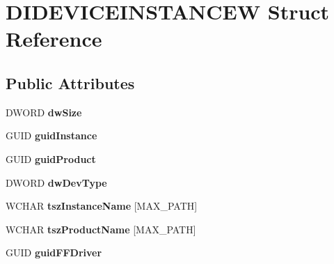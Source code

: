 \hypertarget{struct_d_i_d_e_v_i_c_e_i_n_s_t_a_n_c_e_w}{\section{D\-I\-D\-E\-V\-I\-C\-E\-I\-N\-S\-T\-A\-N\-C\-E\-W Struct Reference}
\label{struct_d_i_d_e_v_i_c_e_i_n_s_t_a_n_c_e_w}
}
\subsection*{Public Attributes}
\begin{DoxyCompactItemize}
\item 
\hypertarget{struct_d_i_d_e_v_i_c_e_i_n_s_t_a_n_c_e_w_a74ad8575e74fade39a58a23053ff9cc6}{D\-W\-O\-R\-D {\bfseries dw\-Size}}\label{struct_d_i_d_e_v_i_c_e_i_n_s_t_a_n_c_e_w_a74ad8575e74fade39a58a23053ff9cc6}

\item 
\hypertarget{struct_d_i_d_e_v_i_c_e_i_n_s_t_a_n_c_e_w_ae70f04afc0a1ec321c6e127a74fe2aea}{G\-U\-I\-D {\bfseries guid\-Instance}}\label{struct_d_i_d_e_v_i_c_e_i_n_s_t_a_n_c_e_w_ae70f04afc0a1ec321c6e127a74fe2aea}

\item 
\hypertarget{struct_d_i_d_e_v_i_c_e_i_n_s_t_a_n_c_e_w_abd493000bafbf8d6c63d4e3be60f510b}{G\-U\-I\-D {\bfseries guid\-Product}}\label{struct_d_i_d_e_v_i_c_e_i_n_s_t_a_n_c_e_w_abd493000bafbf8d6c63d4e3be60f510b}

\item 
\hypertarget{struct_d_i_d_e_v_i_c_e_i_n_s_t_a_n_c_e_w_a1c4b9fe0fb9fc915e7a213e6c2ffd597}{D\-W\-O\-R\-D {\bfseries dw\-Dev\-Type}}\label{struct_d_i_d_e_v_i_c_e_i_n_s_t_a_n_c_e_w_a1c4b9fe0fb9fc915e7a213e6c2ffd597}

\item 
\hypertarget{struct_d_i_d_e_v_i_c_e_i_n_s_t_a_n_c_e_w_ac513af8275475a6ceba700f896b72108}{W\-C\-H\-A\-R {\bfseries tsz\-Instance\-Name} \mbox{[}M\-A\-X\-\_\-\-P\-A\-T\-H\mbox{]}}\label{struct_d_i_d_e_v_i_c_e_i_n_s_t_a_n_c_e_w_ac513af8275475a6ceba700f896b72108}

\item 
\hypertarget{struct_d_i_d_e_v_i_c_e_i_n_s_t_a_n_c_e_w_a1e11fc845c9a7c5bc41a5fa6d7bed917}{W\-C\-H\-A\-R {\bfseries tsz\-Product\-Name} \mbox{[}M\-A\-X\-\_\-\-P\-A\-T\-H\mbox{]}}\label{struct_d_i_d_e_v_i_c_e_i_n_s_t_a_n_c_e_w_a1e11fc845c9a7c5bc41a5fa6d7bed917}

\item 
\hypertarget{struct_d_i_d_e_v_i_c_e_i_n_s_t_a_n_c_e_w_a549002e76313c10b693a332ea2f0becf}{G\-U\-I\-D {\bfseries guid\-F\-F\-Driver}}\label{struct_d_i_d_e_v_i_c_e_i_n_s_t_a_n_c_e_w_a549002e76313c10b693a332ea2f0becf}


\end{DoxyCompactItemize}
